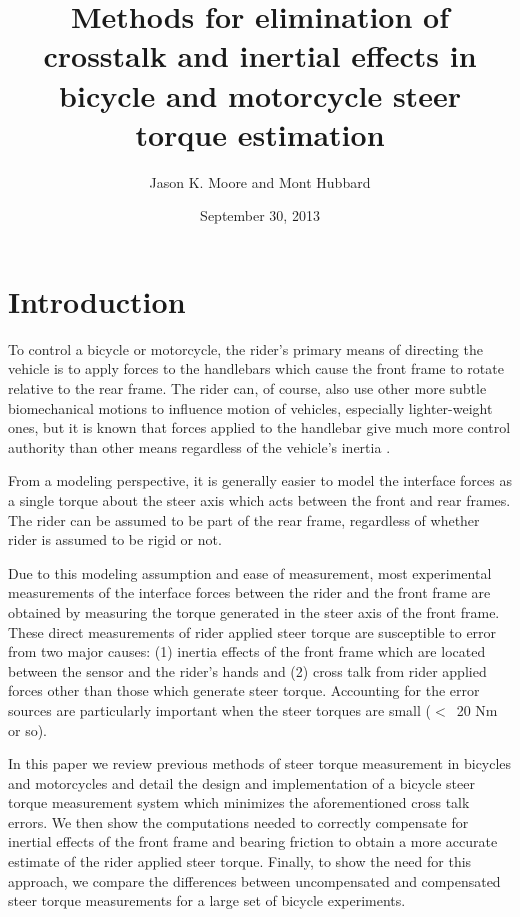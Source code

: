 \documentclass[a4paper]{article}
\title{Methods for elimination of crosstalk and inertial effects in bicycle and
motorcycle steer torque estimation}
\author{Jason K. Moore and Mont Hubbard}
\date{September 30, 2013}
\begin{document}
\maketitle

\section*{Introduction}

To control a bicycle or motorcycle, the rider's primary means of directing the
vehicle is to apply forces to the handlebars which cause the front frame to
rotate relative to the rear frame. The rider can, of course, also use other
more subtle biomechanical motions to influence motion of vehicles, especially
lighter-weight ones, but it is known that forces applied to the handlebar give
much more control authority than other means regardless of the vehicle's
inertia \cite{Sharp2007,Sharp2008a}.

From a modeling perspective, it is generally easier to model the interface
forces as a single torque about the steer axis which acts between the front and
rear frames. The rider can be assumed to be part of the rear frame, regardless
of whether rider is assumed to be rigid or not.

Due to this modeling assumption and ease of measurement, most experimental
measurements of the interface forces between the rider and the front frame are
obtained by measuring the torque generated in the steer axis of the front
frame. These direct measurements of rider applied steer torque are susceptible
to error from two major causes: (1) inertia effects of the front frame which
are located between the sensor and the rider's hands and (2) cross talk from
rider applied forces other than those which generate steer torque. Accounting
for the error sources are particularly important when the steer torques are
small ($<$~20 Nm or so).

In this paper we review previous methods of steer torque measurement in
bicycles and motorcycles and detail the design and implementation of a bicycle
steer torque measurement system which minimizes the aforementioned cross talk
errors. We then show the computations needed to correctly compensate for
inertial effects of the front frame and bearing friction to obtain a more
accurate estimate of the rider applied steer torque. Finally, to show the need
for this approach, we compare the differences between uncompensated and
compensated steer torque measurements for a large set of bicycle experiments.
\end{document}

